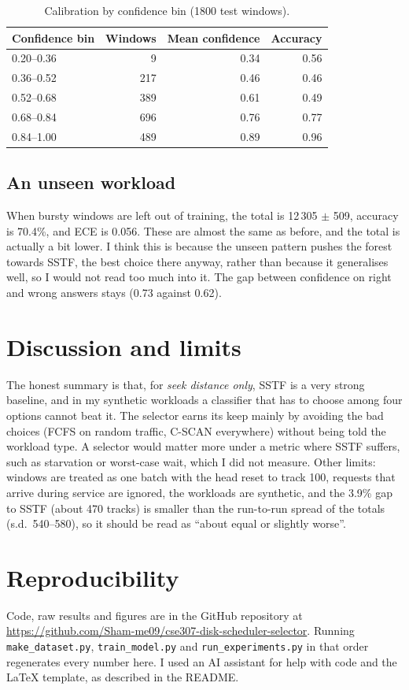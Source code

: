\documentclass[10pt,a4paper]{article}
\begin{document}
\begin{table}[H]
\centering\small
\caption{Calibration by confidence bin (1800 test windows).}
\label{tab:cal}
\begin{tabular}{lrrr}
\toprule
Confidence bin & Windows & Mean confidence & Accuracy \\
\midrule
0.20--0.36 & 9   & 0.34 & 0.56 \\
0.36--0.52 & 217 & 0.46 & 0.46 \\
0.52--0.68 & 389 & 0.61 & 0.49 \\
0.68--0.84 & 696 & 0.76 & 0.77 \\
0.84--1.00 & 489 & 0.89 & 0.96 \\
\bottomrule
\end{tabular}
\end{table}

\subsection{An unseen workload}
When bursty windows are left out of training, the total is 12\,305 $\pm$ 509, accuracy is
70.4\%, and ECE is 0.056. These are almost the same as before, and the total is actually a bit lower. I think this is because the
unseen pattern pushes the forest towards SSTF, the best choice there anyway, rather than because it
generalises well, so I would not read too much into it. The gap between confidence on right and wrong
answers stays (0.73 against 0.62).

\section{Discussion and limits}
The honest summary is that, for \emph{seek distance only}, SSTF is a very strong baseline, and in
my synthetic workloads a classifier that has to choose among four options cannot beat it. The selector earns its keep
mainly by avoiding the bad choices (FCFS on random traffic, C-SCAN everywhere) without being told
the workload type. A selector would matter more under a metric where SSTF suffers, such as
starvation or worst-case wait, which I did not measure. Other limits: windows are treated as one
batch with the head reset to track 100, requests that arrive during service are ignored, the workloads
are synthetic, and the 3.9\% gap to SSTF (about 470 tracks) is smaller than the run-to-run spread of the totals (s.d.\ 540--580), so it
should be read as ``about equal or slightly worse''.

\section{Reproducibility}
Code, raw results and figures are in the GitHub repository at \url{https://github.com/Sham-me09/cse307-disk-scheduler-selector}. Running
\texttt{make\_dataset.py}, \texttt{train\_model.py} and \texttt{run\_experiments.py} in that order regenerates every number here. I used an AI assistant for
help with code and the LaTeX template, as described in the README.
\end{document}
